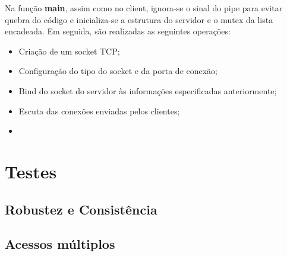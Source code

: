 \documentclass[brazil, 12pt]{article}
\begin{document}
		Na função \textbf{main}, assim como no client, ignora-se o sinal do pipe para evitar quebra do código e inicializa-se a estrutura do servidor e o mutex da lista encadeada. Em seguida, são realizadas as seguintes operações:
		
		\begin{itemize}
			\item Criação de um socket TCP;
			\item Configuração do tipo do socket e da porta de conexão;
			\item Bind do socket do servidor às informações especificadas anteriormente;
			\item Escuta das conexões enviadas pelos clientes;
			\item 
		\end{itemize}
	
\section{Testes}

	\subsection{Robustez e Consistência}
	
	
	
	\subsection{Acessos múltiplos}
	
	
	
\end{document}
